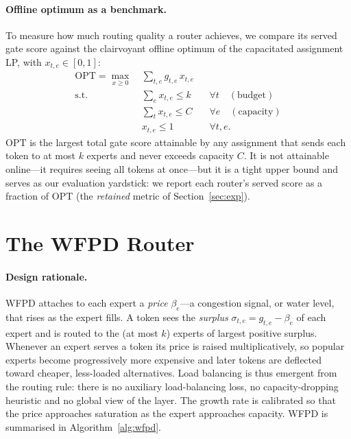 \documentclass[preprint,12pt]{elsarticle}
\theoremstyle{plain}
\theoremstyle{remark}
\newcommand{\opt}{\mathrm{OPT}}
\begin{document}
\paragraph{Offline optimum as a benchmark.}
To measure how much routing quality a router achieves, we compare its served
gate score against the clairvoyant offline optimum of the capacitated
assignment LP, with $x_{t,e}\in[0,1]$:
\begin{equation}
\label{eq:primal}
\begin{aligned}
  \opt=\max_{x\ge 0}\ & \sum_{t,e} g_{t,e}\,x_{t,e}\\
  \text{s.t.}\quad
  & \textstyle\sum_{e} x_{t,e}\le k && \forall t\quad(\text{budget})\\
  & \textstyle\sum_{t} x_{t,e}\le C && \forall e\quad(\text{capacity})\\
  & x_{t,e}\le 1 && \forall t,e.
\end{aligned}
\end{equation}
$\opt$ is the largest total gate score attainable by any assignment that
sends each token to at most $k$ experts and never exceeds capacity $C$. It
is not attainable online---it requires seeing all tokens at once---but it is
a tight upper bound and serves as our evaluation yardstick: we report each
router's served score as a fraction of $\opt$ (the \emph{retained} metric of
Section~\ref{sec:exp}).

\section{The WFPD Router}
\label{sec:algo}

\paragraph{Design rationale.}
WFPD attaches to each expert a \emph{price} $\beta_e$---a congestion signal,
or water level, that rises as the expert fills. A token sees the
\emph{surplus} $\sigma_{t,e}=g_{t,e}-\beta_e$ of each expert and is routed to
the (at most $k$) experts of largest positive surplus. Whenever an expert
serves a token its price is raised multiplicatively, so popular experts
become progressively more expensive and later tokens are deflected toward
cheaper, less-loaded alternatives. Load balancing is thus emergent from the
routing rule: there is no auxiliary load-balancing loss, no
capacity-dropping heuristic and no global view of the layer. The growth rate
is calibrated so that the price approaches saturation as the expert
approaches capacity. WFPD is summarised in Algorithm~\ref{alg:wfpd}.
\end{document}
